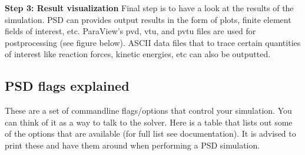 \textbf{Step 3: Result visualization} Final step is to have a look at
the results of the simulation. PSD can provides output results in the
form of plots, finite element fields of interest, etc. ParaView's pvd,
vtu, and pvtu files are used for postprocessing (see figure below).
ASCII data files that to trace certain quantities of interest like
reaction forces, kinetic energies, etc can also be outputted.

\subsection{PSD flags explained}

These are a set of commandline flags/options that control your
simulation. You can think of it as a way to talk to the solver. Here is
a table that lists out some of the options that are available (for full
list see documentation). It is advised to print these and have them
around when performing a PSD simulation.

